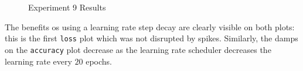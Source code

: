 \documentclass[11pt,a4paper]{article}
\begin{document}
\begin{figure}[H]
    \centering
    \qquad
    \caption{Experiment 9 Results}
\end{figure}
\noindent
The benefits os using a learning rate step decay are clearly visible on both plots: this is the first \texttt{loss} plot which was not disrupted by spikes. Similarly, the damps on the \texttt{accuracy} plot decrease as the learning rate scheduler decreases the learning rate every $20$ epochs.
\end{document}

